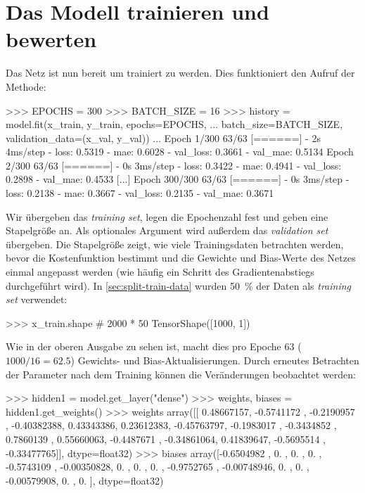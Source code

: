 \section{Das Modell trainieren und bewerten}
\label{sec:train-evaluate-model}
Das Netz ist nun bereit um trainiert zu werden.
Dies funktioniert den Aufruf der  Methode:
\begin{pyconcode}
>>> EPOCHS = 300
>>> BATCH_SIZE = 16
>>> history = model.fit(x_train, y_train, epochs=EPOCHS,
...                     batch_size=BATCH_SIZE, validation_data=(x_val, y_val))
...
Epoch 1/300
63/63 [======] - 2s 4ms/step - loss: 0.5319     - mae: 0.6028
                             - val_loss: 0.3661 - val_mae: 0.5134
Epoch 2/300
63/63 [======] - 0s 3ms/step - loss: 0.3422     - mae: 0.4941
                             - val_loss: 0.2898 - val_mae: 0.4533
[...]
Epoch 300/300
63/63 [======] - 0s 3ms/step - loss: 0.2138     - mae: 0.3667
                             - val_loss: 0.2135 - val_mae: 0.3671
\end{pyconcode}
Wir übergeben das \textit{training set}, legen die Epochenzahl fest
und geben eine Stapelgröße an.
Als optionales Argument wird außerdem das \textit{validation set}
übergeben. Die Stapelgröße zeigt, wie viele Trainingsdaten betrachten werden,
bevor die Kostenfunktion bestimmt und die Gewichte und Bias-Werte
des Netzes einmal angepasst werden
(wie häufig ein Schritt des Gradientenabstiegs durchgeführt wird).
In \autoref{sec:split-train-data} wurden \qty{50}{\percent} der Daten
als \textit{training set} verwendet:
\begin{pyconcode}
>>> x_train.shape # 2000 * 50%
TensorShape([1000, 1])
\end{pyconcode}
Wie in der oberen Ausgabe zu sehen ist, macht dies
pro Epoche 63 ($1000 / 16 = \num{62.5}$) Gewichts- und Bias-Aktualisierungen.
Durch erneutes Betrachten der Parameter nach dem Training
können die Veränderungen beobachtet werden:
\begin{pyconcode}
>>> hidden1 = model.get_layer("dense")
>>> weights, biases = hidden1.get_weights()
>>> weights
array([[ 0.48667157, -0.5741172 , -0.2190957 , -0.40382388,  0.43343386,
         0.23612383, -0.45763797, -0.1983017 , -0.3434852 ,  0.7860139 ,
         0.55660063, -0.4487671 , -0.34861064,  0.41839647, -0.5695514 ,
        -0.33477765]], dtype=float32)
>>> biases
array([-0.6504982 ,  0.        ,  0.        ,  0.        , -0.5743109 ,
       -0.00350828,  0.        ,  0.        ,  0.        , -0.9752765 ,
       -0.00748946,  0.        ,  0.        , -0.00579908,  0.        ,
        0.        ], dtype=float32)
\end{pyconcode}
